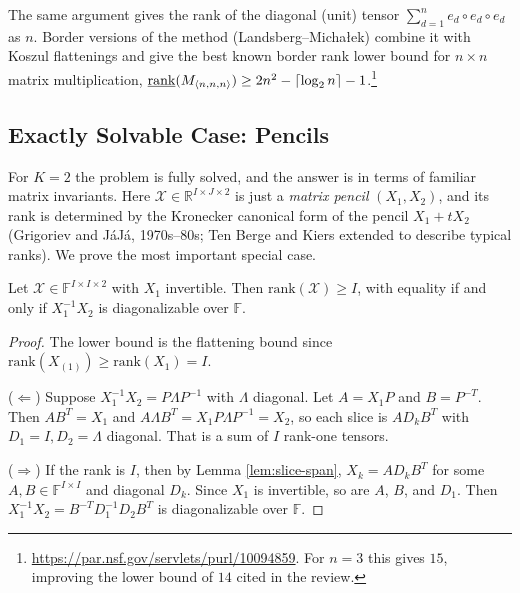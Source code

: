     The same argument gives the rank of the diagonal (unit) tensor $\sum_{d=1}^n e_d \circ e_d \circ e_d$ as $n$. Border versions of the method (Landsberg--Micha{\l}ek) combine it with Koszul flattenings and give the best known border rank lower bound for $n \times n$ matrix multiplication, $\underline{\mathrm{rank}}(M_{\langle n,n,n \rangle}) \geq 2n^2 - \lceil \log_2 n \rceil - 1$.\footnote{\url{https://par.nsf.gov/servlets/purl/10094859}. For $n = 3$ this gives $15$, improving the lower bound of $14$ cited in the review.}

\subsection{Exactly Solvable Case: Pencils}

  For $K = 2$ the problem is fully solved, and the answer is in terms of familiar matrix invariants. Here $\mathcal{X} \in \mathbb{R}^{I \times J \times 2}$ is just a \textit{matrix pencil} $(X_1, X_2)$, and its rank is determined by the Kronecker canonical form of the pencil $X_1 + t X_2$ (Gri\-gor\-iev and J\'aJ\'a, 1970s--80s; Ten Berge and Kiers extended to describe typical ranks).
  We prove the most important special case.

  \begin{theorem}
    \label{thm:pencil}
    Let $\mathcal{X} \in \mathbb{F}^{I \times I \times 2}$ with $X_1$ invertible. Then $\mathrm{rank}(\mathcal{X}) \geq I$, with equality if and only if $X_1^{-1} X_2$ is diagonalizable over $\mathbb{F}$.
  \end{theorem}
  \begin{proof}
    The lower bound is the flattening bound since $\mathrm{rank}(X_{(1)}) \geq \mathrm{rank}(X_1) = I$.

    ($\Leftarrow$) Suppose $X_1^{-1} X_2 = P \Lambda P^{-1}$ with $\Lambda$ diagonal. Let $A = X_1 P$ and $B = P^{-T}$. Then $A B^T = X_1$ and $A \Lambda B^T = X_1 P \Lambda P^{-1} = X_2$, so each slice is $A D_k B^T$ with $D_1 = I, D_2 = \Lambda$ diagonal. That is a sum of $I$ rank-one tensors.

    ($\Rightarrow$) If the rank is $I$, then by Lemma \ref{lem:slice-span}, $X_k = A D_k B^T$ for some $A, B \in \mathbb{F}^{I \times I}$ and diagonal $D_k$. Since $X_1$ is invertible, so are $A$, $B$, and $D_1$. Then $X_1^{-1} X_2 = B^{-T} D_1^{-1} D_2 B^T$ is diagonalizable over $\mathbb{F}$.
  \end{proof}

